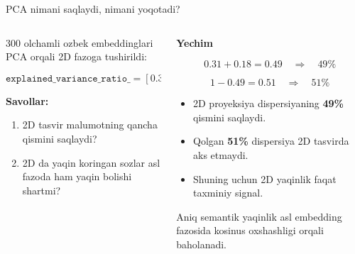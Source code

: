 \documentclass[aspectratio=169,11pt]{beamer}
\begin{document}
\begin{frame}{PCA nimani saqlaydi, nimani yo\textquotesingle{}qotadi?}
\footnotesize

\begin{columns}[T,totalwidth=\textwidth]
\begin{column}{0.48\textwidth}

\begin{tcolorbox}[alertbox,title=Vazifa,left=2mm,right=2mm,top=1mm,bottom=1mm]
300 o\textquotesingle{}lchamli o\textquotesingle{}zbek embeddinglari PCA orqali
2D fazoga tushirildi:

\[
\texttt{explained\_variance\_ratio\_}=[0.31,\;0.18]
\]

\textbf{Savollar:}
\begin{enumerate}\setlength\itemsep{2pt}
  \item 2D tasvir ma\textquotesingle{}lumotning qancha qismini saqlaydi?
  \item 2D da yaqin ko\textquotesingle{}ringan so\textquotesingle{}zlar asl fazoda ham yaqin bo\textquotesingle{}lishi shartmi?
\end{enumerate}
\end{tcolorbox}

\end{column}

\begin{column}{0.48\textwidth}

\textbf{Yechim}

\[
0.31+0.18=0.49
\quad\Rightarrow\quad
49\%
\]

\[
1-0.49=0.51
\quad\Rightarrow\quad
51\%
\]

\begin{itemize}\setlength\itemsep{3pt}
  \item 2D proyeksiya dispersiyaning \textbf{49\%} qismini saqlaydi.
  \item Qolgan \textbf{51\%} dispersiya 2D tasvirda aks etmaydi.
  \item Shuning uchun 2D yaqinlik faqat taxminiy signal.
\end{itemize}

\vspace{2pt}

\begin{tcolorbox}[defbox,left=2mm,right=2mm,top=1mm,bottom=1mm]
\footnotesize
Aniq semantik yaqinlik asl embedding fazosida
kosinus o\textquotesingle{}xshashligi orqali baholanadi.
\end{tcolorbox}

\end{column}
\end{columns}

\end{frame}
\end{document}
